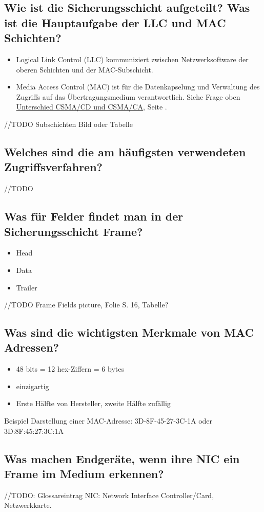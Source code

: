 \subsection*{Wie ist die Sicherungsschicht aufgeteilt? Was ist die Hauptaufgabe der LLC und MAC Schichten?}
\begin{itemize}
    \item Logical Link Control (LLC) kommuniziert zwischen Netzwerksoftware der oberen Schichten und der MAC-Subschicht.
    \item Media Access Control (MAC) ist für die Datenkapselung und Verwaltung des Zugriffs auf das Übertragungsmedium verantwortlich. Siehe Frage oben \underline{\hyperref[sub:csma]{Unterschied CSMA/CD und CSMA/CA}}, Seite \pageref{sub:csma}.
\end{itemize}
//TODO Subschichten Bild oder Tabelle

\subsection*{Welches sind die am häufigsten verwendeten Zugriffsverfahren?}
//TODO

\subsection*{Was für Felder findet man in der Sicherungsschicht Frame?}
\begin{itemize}
    \item Head
    \item Data
    \item Trailer
\end{itemize}
//TODO Frame Fields picture, Folie S. 16, Tabelle?

\subsection*{Was sind die wichtigsten Merkmale von MAC Adressen?}
\begin{itemize}
    \item 48 bits = 12 hex-Ziffern = 6 bytes
    \item einzigartig
    \item Erste Hälfte von Hersteller, zweite Hälfte zufällig
\end{itemize}
Beispiel Darstellung einer MAC-Adresse: 3D-8F-45-27-3C-1A oder 3D:8F:45:27:3C:1A

\subsection*{Was machen Endgeräte, wenn ihre NIC ein Frame im Medium erkennen?}
//TODO: Glossareintrag NIC: Network Interface Controller/Card, Netzwerkkarte.\\


